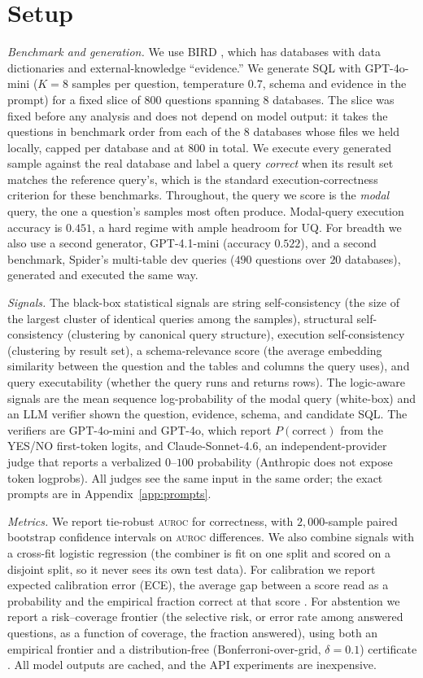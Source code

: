 \documentclass[11pt]{article}
\newcommand{\auroc}{\textsc{auroc}}
\begin{document}
\section{Setup}
\textit{Benchmark and generation.} We use BIRD \citep{li2023bird}, which has databases with data
dictionaries and external-knowledge ``evidence.'' We generate SQL with GPT-4o-mini ($K=8$ samples
per question, temperature $0.7$, schema and evidence in the prompt) for a fixed slice of 800 questions
spanning 8 databases. The slice was fixed before any analysis and does not depend on model output: it
takes the questions in benchmark order from each of the 8 databases whose files we held locally,
capped per database and at 800 in total. We execute every generated sample against the real database
and label a query \emph{correct} when its result set matches the reference query's, which is the
standard execution-correctness criterion for these benchmarks. Throughout, the query we score is the
\emph{modal} query, the one a question's samples most often produce. Modal-query execution accuracy is
$0.451$, a hard regime with ample headroom for UQ. For breadth we also use a second generator,
GPT-4.1-mini (accuracy $0.522$), and a second benchmark, Spider's \citep{yu2018spider} multi-table dev
queries ($490$ questions over $20$ databases), generated and executed the same way.

\textit{Signals.} The black-box statistical signals are string self-consistency (the size of the
largest cluster of identical queries among the samples), structural self-consistency (clustering by
canonical query structure), execution self-consistency (clustering by result set), a schema-relevance
score (the average embedding similarity between the question and the tables and columns the query
uses), and query executability (whether the query runs and returns rows). The logic-aware signals are
the mean sequence log-probability of the modal query (white-box) and an LLM verifier shown the
question, evidence, schema, and candidate SQL. The verifiers are GPT-4o-mini and GPT-4o, which report
$P(\text{correct})$ from the YES/NO first-token logits, and Claude-Sonnet-4.6, an
independent-provider judge that reports a verbalized $0$--$100$ probability (Anthropic does not expose
token logprobs). All judges see the same input in the same order; the exact prompts are in
Appendix~\ref{app:prompts}.

\textit{Metrics.} We report tie-robust \auroc{} for correctness, with $2{,}000$-sample paired
bootstrap confidence intervals on \auroc{} differences. We also combine signals with a cross-fit
logistic regression (the combiner is fit on one split and scored on a disjoint split, so it never
sees its own test data). For calibration we report expected calibration error (ECE), the average gap
between a score read as a probability and the empirical fraction correct at that score
\citep{guo2017calibration}. For abstention we report a risk--coverage frontier (the selective risk,
or error rate among answered questions, as a function of coverage, the fraction answered), using both
an empirical frontier and a distribution-free (Bonferroni-over-grid, $\delta=0.1$) certificate
\citep{angelopoulos2021ltt}. All model outputs are cached, and the API experiments are inexpensive.
\end{document}
